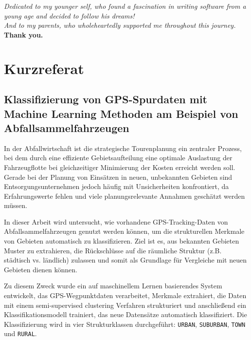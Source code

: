 \documentclass[a4paper,12pt,twoside]{scrreprt}
\begin{document}
\vspace{1cm}
\begin{center}
  \emph{Dedicated to my younger self, who found a fascination in writing
    software from
    a young age and decided to follow his dreams!}\\[0.5cm]
  \emph{And to my parents, who wholeheartedly supported me throughout this
    journey.}\\[0.5cm]
  \textbf{Thank you.}
\end{center}
\vspace{1cm}

\newpage
\section*{Kurzreferat}

\subsection*{Klassifizierung von GPS-Spurdaten mit Machine Learning Methoden am
  Beispiel von Abfallsammelfahrzeugen}

In der Abfallwirtschaft ist die strategische Tourenplanung ein zentraler
Prozess, bei dem durch eine effiziente Gebietsaufteilung eine optimale
Auslastung der Fahrzeugflotte bei gleichzeitiger Minimierung der Kosten
erreicht werden soll. Gerade bei der Planung von Einsätzen in neuen,
unbekannten Gebieten sind Entsorgungsunternehmen jedoch häufig mit
Unsicherheiten konfrontiert, da Erfahrungswerte fehlen und viele
planungsrelevante Annahmen geschätzt werden müssen.

In dieser Arbeit wird untersucht, wie vorhandene GPS-Tracking-Daten von
Abfallsammelfahrzeugen genutzt werden können, um die strukturellen Merkmale
von
Gebieten automatisch zu klassifizieren. Ziel ist es, aus bekannten Gebieten
Muster zu extrahieren, die Rückschlüsse auf die räumliche Struktur (z.B.
städtisch vs. ländlich) zulassen und somit als Grundlage für Vergleiche mit
neuen
Gebieten dienen können.

Zu diesem Zweck wurde ein auf maschinellem Lernen basierendes System
entwickelt, das
GPS-Wegpunktdaten verarbeitet, Merkmale extrahiert, die Daten mit einem
semi-supervised clustering Verfahren strukturiert und anschließend ein
Klassifikationsmodell trainiert, das neue Datensätze automatisch
klassifiziert. Die Klassifizierung
wird in vier Strukturklassen durchgeführt: \texttt{URBAN},
\texttt{SUBURBAN}, \texttt{TOWN} und \texttt{RURAL}.
\end{document}
